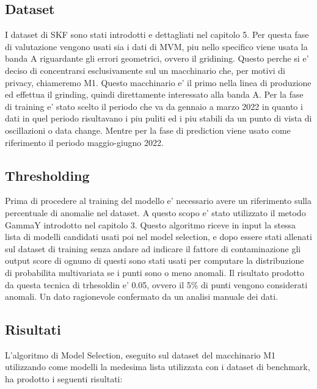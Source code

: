 \subsection{Dataset}
I dataset di SKF sono stati introdotti e dettagliati nel capitolo 5. Per questa fase di valutazione vengono usati sia i dati di MVM, piu nello specifico viene usata la banda A riguardante gli errori geometrici, ovvero il gridining. Questo perche si e' deciso di concentrarsi esclusivamente sul un macchinario che, per motivi di privacy, chiameremo M1. Questo macchinario e' il primo nella linea di produzione ed effettua il grinding, quindi direttamente interessato alla banda A.
Per la fase di training e' stato scelto il periodo che va da gennaio a marzo 2022 in quanto i dati in quel periodo risultavano i piu puliti ed i piu stabili da un punto di vista di oscillazioni o data change. Mentre per la fase di prediction viene usato come riferimento il periodo maggio-giugno 2022.



\subsection{Thresholding}
Prima di procedere al training del modello e' necessario avere un riferimento sulla percentuale di anomalie nel dataset. A questo scopo e' stato utilizzato il metodo GammaY introdotto nel capitolo 3.
Questo algoritmo riceve in input la stessa lista di modelli candidati usati poi nel model selection, e dopo essere stati allenati sul dataset di training senza andare ad indicare il fattore di contaminazione gli output score di ognuno di questi sono stati usati per computare la distribuzione di probabilita multivariata se i punti sono o meno anomali.
Il risultato prodotto da questa tecnica di trhesoldin e' 0.05, ovvero il 5\% di punti vengono considerati anomali. Un dato ragionevole confermato da un analisi manuale dei dati.


\subsection{Risultati}
L'algoritmo di Model Selection, eseguito sul dataset del macchinario M1 utilizzando come modelli la medesima lista utilizzata con i dataset di benchmark, ha prodotto i seguenti risultati:

